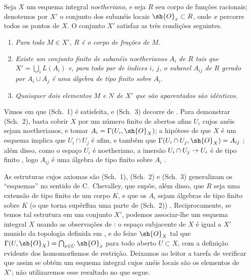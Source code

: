 \documentclass[oneside]{amsart}
\makeatletter
\newcommand{\ega@arrow}[2]{\mathchoice{#1}{#2}{#2}{#2}}
\renewcommand{\to}{\ega@arrow{\longrightarrow}{\rightarrow}}
\newcommand{\oldpage}[2][]{{\marginnote{\normalfont\textbf{#1}~|~#2}}\ignorespaces}
\let\EGAOriginalLabel\label
\renewcommand{\label}[1]{\phantomsection\EGAOriginalLabel{#1}}
\makeatother
\begin{document}
\begin{env}[8.3.1]
\label{I.8.3.1}
Seja $X$ um esquema integral \emph{noetheriano}, e seja $R$ seu corpo de funções racionais;
denotemos por $X'$ o conjunto dos subanéis locais $\sh{O}_x\subset R$, onde $x$ percorre todos os pontos de $X$.
O conjunto $X'$ satisfaz as três condições seguintes.
\begin{enumerate}
  \item[(Sch.~1)] \emph{Para todo $M\in X'$, $R$ é o corpo de frações de $M$.}
  \item[(Sch.~2)] \emph{Existe um conjunto finito de subanéis noetherianos $A_i$ de $R$ tais que $X'=\bigcup_i L(A_i)$ e, para todo par de índices $i$, $j$, o subanel $A_{ij}$ de $R$ gerado por $A_i\cup A_j$ é uma álgebra de tipo finito sobre $A_i$.}
  \item[(Sch.~3)] \emph{Quaisquer dois elementos $M$ e $N$ de $X'$ que são aparentados são idênticos.}
\end{enumerate}
\end{env}

Vimos em  que (Sch.~1) é satisfeita, e (Sch.~3) decorre de .
Para demonstrar (Sch.~2), basta cobrir $X$ por um número finito de abertos afins $U_i$ cujos anéis sejam noetherianos, e tomar $A_i=\Gamma(U_i,\sh{O}_X)$;
a hipótese de que $X$ é um esquema implica que $U_i\cap U_j$ é afim, e também que $\Gamma(U_i\cap U_j,\sh{O}_X)=A_{ij}$ ;
além disso, como o espaço $U_i$ é noetheriano, a imersão $U_i\cap U_j\to U_i$ é de tipo finito , logo $A_{ij}$ é uma álgebra de tipo finito sobre $A_i$ .

\begin{env}[8.3.2]
\label{I.8.3.2}
As estruturas cujos axiomas são (Sch.~1), (Sch.~2) e (Sch.~3) generalizam os ``esquemas'' no sentido de C.~Chevalley, que supõe, além disso, que $R$ seja uma extensão de tipo finito de um corpo $K$, e que os $A_i$ sejam álgebras de tipo finito sobre $K$ (o que torna supérflua uma parte de (Sch.~2)) \cite{I-1}.
Reciprocamente, se temos tal estrutura em um conjunto $X'$, podemos associar-lhe um esquema integral $X$ usando as observações de : o espaço subjacente de $X$ é igual a $X'$ munido da topologia definida em , e do feixe $\sh{O}_X$
\oldpage[I]{169}
tal que $\Gamma(U,\sh{O}_X)=\bigcap_{x\in U}\sh{O}_x$ para todo aberto $U\subset X$, com a definição evidente dos homomorfismos de restrição.
Deixamos ao leitor a tarefa de verificar que assim se obtém um esquema integral cujos anéis locais são os elementos de $X'$;
não utilizaremos esse resultado no que segue.
\end{env}
\end{document}
